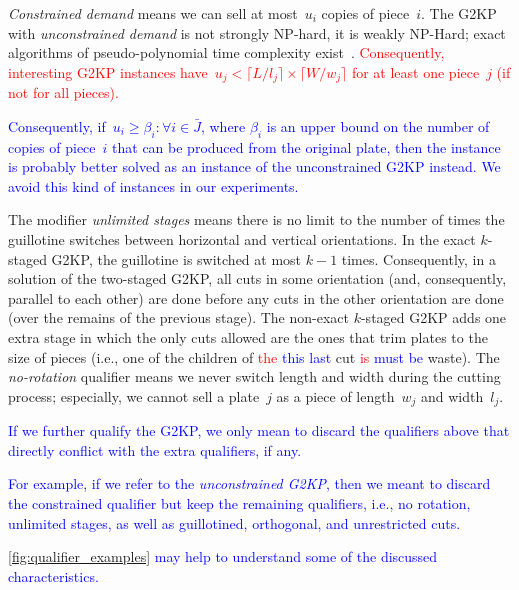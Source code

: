 \documentclass[ppgc,tese,english,formais,babel]{iiufrgs}
\newif\iffinalversion
\newcommand{\newtext}[1]{\iffinalversion%
#1%
\else%
\textcolor{blue}{#1}%
\fi%
}
\newcommand{\oldtext}[1]{\iffinalversion%
\else%
\textcolor{red}{#1}%
\fi%
}
\begin{document}
\emph{Constrained demand} means we can sell at most~\(u_i\) copies of piece~\(i\).
The G2KP with \emph{unconstrained demand} is not strongly NP-hard, it is weakly NP-Hard; exact algorithms of pseudo-polynomial time complexity exist~\citep{beasley:1985:guillotine}.
\oldtext{Consequently, interesting G2KP instances have~\(u_j < \lceil L / l_j \rceil \times \lceil W / w_j \rceil \) for at least one piece~\(j\) (if not for all pieces).}
\newtext{Consequently, if~\(u_i \geq \beta_i : \forall i \in \bar{J}\), where \(\beta_i\) is an upper bound on the number of copies of piece~\(i\) that can be produced from the original plate, then the instance is probably better solved as an instance of the unconstrained G2KP instead. We avoid this kind of instances in our experiments.}
The modifier \emph{unlimited stages} means there is no limit to the number of times the guillotine switches between horizontal and vertical orientations.
In the exact \(k\)-staged G2KP, the guillotine is switched at most \(k-1\) times.
Consequently, in a solution of the two-staged G2KP, all cuts in some orientation (and, consequently, parallel to each other) are done before any cuts in the other orientation are done (over the remains of the previous stage).
The non-exact \(k\)-staged G2KP adds one extra stage in which the only cuts allowed are the ones that trim plates to the size of pieces (i.e., one of the children of \oldtext{the}\newtext{this last} cut \oldtext{is}\newtext{must be} waste).
The \emph{no-rotation} qualifier means we never switch length and width during the cutting process; especially, we cannot sell a plate~\(j\) as a piece of length~\(w_j\) and width~\(l_j\).

\newtext{If we further qualify the G2KP, we only mean to discard the qualifiers above that directly conflict with the extra qualifiers, if any.}
\newtext{For example, if we refer to the \emph{unconstrained G2KP}, then we meant to discard the constrained qualifier but keep the remaining qualifiers, i.e., no rotation, unlimited stages, as well as guillotined, orthogonal, and unrestricted cuts.}
\newtext{\autoref{fig:qualifier_examples} may help to understand some of the discussed characteristics.}
\end{document}
